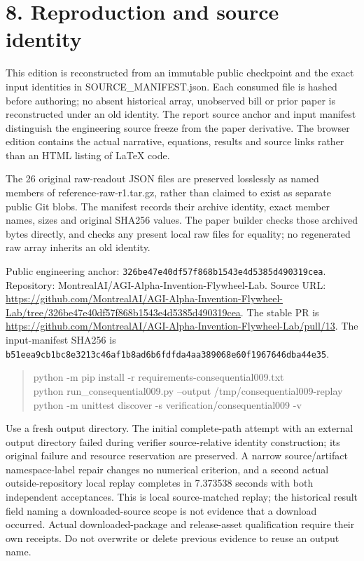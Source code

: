 \documentclass[10pt,letterpaper]{article}
\begin{document}
\section*{\color{accent}8. Reproduction and source identity}
This edition is reconstructed from an immutable public checkpoint and the exact input identities in SOURCE\_\allowbreak{}MANIFEST.json. Each consumed file is hashed before authoring; no absent historical array, unobserved bill or prior paper is reconstructed under an old identity. The report source anchor and input manifest distinguish the engineering source freeze from the paper derivative. The browser edition contains the actual narrative, equations, results and source links rather than an HTML listing of LaTeX code.\par
The 26 original raw-readout JSON files are preserved losslessly as named members of reference-raw-r1.tar.gz, rather than claimed to exist as separate public Git blobs. The manifest records their archive identity, exact member names, sizes and original SHA256 values. The paper builder checks those archived bytes directly, and checks any present local raw files for equality; no regenerated raw array inherits an old identity.\par
Public engineering anchor: \texttt{326be47e40df\allowbreak{}57f868b1543e\allowbreak{}4d5385d49031\allowbreak{}9cea}. Repository: MontrealAI/AGI-Alpha-Invention-Flywheel-Lab. Source URL: \url{https://github.com/MontrealAI/AGI-Alpha-Invention-Flywheel-Lab/tree/326be47e40df57f868b1543e4d5385d490319cea}. The stable PR is \url{https://github.com/MontrealAI/AGI-Alpha-Invention-Flywheel-Lab/pull/13}. The input-manifest SHA256 is \texttt{b51eea9cb1bc\allowbreak{}8e3213c46af1\allowbreak{}b8ad6b6fdfda\allowbreak{}4aa389068e60\allowbreak{}f1967646dba4\allowbreak{}4e35}.\par
\begin{quote}\footnotesize\ttfamily\raggedright python -m pip install -r requirements-consequential009.txt\\python run\_\allowbreak{}consequential009.py --output /tmp/consequential009-replay\\python -m unittest discover -s verification/consequential009 -v\end{quote}
Use a fresh output directory. The initial complete-path attempt with an external output directory failed during verifier source-relative identity construction; its original failure and resource reservation are preserved. A narrow source/artifact namespace-label repair changes no numerical criterion, and a second actual outside-repository local replay completes in 7.373538 seconds with both independent acceptances. This is local source-matched replay; the historical result field naming a downloaded-source scope is not evidence that a download occurred. Actual downloaded-package and release-asset qualification require their own receipts. Do not overwrite or delete previous evidence to reuse an output name.\par
\end{document}
